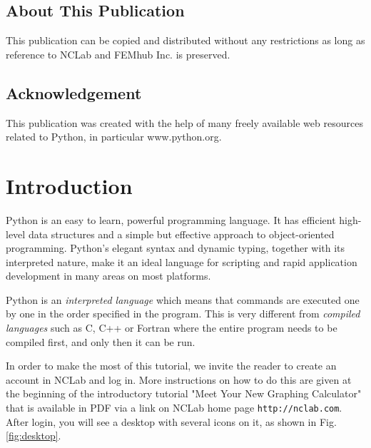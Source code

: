 \documentclass[article,A4,12pt]{llncs}
\begin{document}
\subsection*{About This Publication}
This publication can be copied and distributed without any restrictions
as long as reference to NCLab and FEMhub Inc. is preserved.

\subsection*{Acknowledgement}
This publication was created with the help of many freely 
available web resources related to Python, in
particular www.python.org.

\normalsize

\newpage
\setcounter{tocdepth}{2}
\tableofcontents

\newpage

\pagestyle{plain}
\setcounter{page}{1}


\section{Introduction}

Python is an easy to learn, powerful programming language. It has efficient high-level 
data structures and a simple but effective approach to object-oriented programming. 
Python's elegant syntax and dynamic typing, together with its interpreted nature, 
make it an ideal language for scripting and rapid application development in many 
areas on most platforms. 

Python is an {\em interpreted language} which means that commands are executed one by one 
in the order specified in the program. This is very different from {\em compiled languages}
such as C, C++ or Fortran where the entire program needs to be compiled first, and only
then it can be run. 

In order to make the most of this tutorial, we invite the 
reader to create an account in NCLab and log in. More instructions 
on how to do this are given at the beginning of the introductory 
tutorial "Meet Your New Graphing Calculator" that is available in 
PDF via a link on NCLab home page {\tt http://nclab.com}.
After login, you will see a desktop with several icons on it,
as shown in Fig. \ref{fig:desktop}. 
\end{document}

